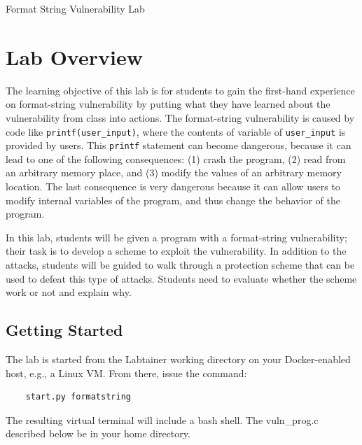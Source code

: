 







\begin{center}
{\LARGE Format String Vulnerability Lab}
\end{center}

\copyrightnotice


\section{Lab Overview}

The learning objective of this lab is for students to gain the first-hand
experience on format-string vulnerability by putting what they have learned 
about the vulnerability from class into actions.
The format-string vulnerability is caused by code like 
{\tt printf(user\_input)}, where the contents of variable
of {\tt user\_input} is provided by users. 
This {\tt printf}
statement can become dangerous, because it can lead to one of the following
consequences: (1) crash the 
program, (2) read from an arbitrary memory place, and (3) modify
the values of an arbitrary memory location. The last consequence
is very dangerous because it can allow users to modify internal
variables of the program, and thus change the behavior
of the program.  


In this lab, students will be given a program with a format-string
vulnerability; their task is to develop a scheme to exploit
the vulnerability.  In addition to the
attacks, students will be guided to walk through a protection
scheme that can be used to defeat this type of attacks. 
Students need to evaluate
whether the scheme work or not and explain why.


\subsection{Getting Started}
The lab is started from the Labtainer working 
directory on your Docker-enabled host, e.g., a Linux VM.
From there, issue the command:
\begin{verbatim}
    start.py formatstring
\end{verbatim}

The resulting virtual terminal will include 
a bash shell.  The vuln\_prog.c 
described below be in your home directory.

